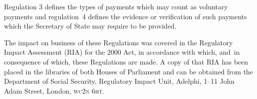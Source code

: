 \documentclass[12pt,a4paper]{article}
\begin{document}
Regulation 3 defines the types of payments which may count as voluntary payments and regulation~4 defines the evidence or verification of such payments which the Secretary of State may require to be provided.

The impact on business of these Regulations was covered in the Regulatory Impact Assessment (RIA) for the 2000 Act, in accordance with which, and~in consequence of which, these Regulations are made. A copy of that RIA has been placed in the libraries of both Houses of Parliament and can be obtained from the Department of Social Security, Regulatory Impact Unit, Adelphi, 1--11 John Adam Street, London, \textsc{\lowercase{WC2N 6HT}}. 
\end{document}
